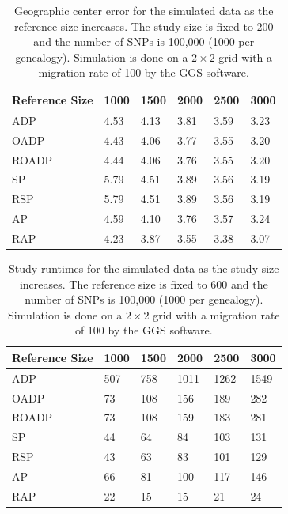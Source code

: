 \documentclass{article}
\begin{document}
\begin{table}
  \centering
  \begin{tabular}{|l|l|l|l|l|l|}
    \hline
    Reference Size & 1000  & 1500 & 2000 & 2500 & 3000 \\
    \hline
    ADP        & 4.53  & 4.13 & 3.81 & 3.59 & 3.23 \\
    OADP       & 4.43  & 4.06 & 3.77 & 3.55 & 3.20 \\
    ROADP      & 4.44  & 4.06 & 3.76 & 3.55 & 3.20 \\
    SP         & 5.79  & 4.51 & 3.89 & 3.56 & 3.19 \\
    RSP        & 5.79  & 4.51 & 3.89 & 3.56 & 3.19 \\
    AP         & 4.59  & 4.10 & 3.76 & 3.57 & 3.24 \\
    RAP        & 4.23  & 3.87 & 3.55 & 3.38 & 3.07 \\
    \hline
  \end{tabular}
  \caption{
    Geographic center error for the simulated data as the reference size increases.
    The study size is fixed to 200 and the number of SNPs is 100,000 (1000 per genealogy). 
    Simulation is done on a $2 \times 2$ grid with a migration rate of 100 by the GGS software. 
  }
  \label{tbl:nChg-accuracy-ctr}
\end{table}

\begin{table}
  \centering
  \begin{tabular}{|l|l|l|l|l|l|}
    \hline
    Reference Size & 1000 & 1500 & 2000 & 2500 & 3000 \\
    \hline
    ADP        & 507  & 758 & 1011 & 1262 & 1549 \\
    OADP       &  73  & 108 &  156 &  189 &  282 \\
    ROADP      &  73  & 108 &  159 &  183 &  281 \\
    SP         &  44  &  64 &   84 &  103 &  131 \\
    RSP        &  43  &  63 &   83 &  101 &  129 \\
    AP         &  66  &  81 &  100 &  117 &  146 \\
    RAP        &  22  &  15 &   15 &   21 &   24 \\
    \hline
  \end{tabular}
  \caption{
    Study runtimes for the simulated data as the study size increases.
    The reference size is fixed to 600 and the number of SNPs is 100,000 (1000 per genealogy). 
    Simulation is done on a $2 \times 2$ grid with a migration rate of 100 by the GGS software. 
  }
  \label{tbl:mChg-runtimes-study}
\end{table}
\end{document}
